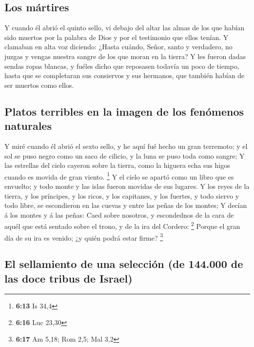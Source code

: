 \hypertarget{los-muxe1rtires}{%
\subsection{Los mártires}\label{los-muxe1rtires}}

 Y cuando él abrió el quinto sello, vi debajo del altar
las almas de los que habían sido muertos por la palabra de Dios y por el
testimonio que ellos tenían.  Y clamaban en alta voz
diciendo: ¿Hasta cuándo, Señor, santo y verdadero, no juzgas y vengas
nuestra sangre de los que moran en la tierra?  Y les
fueron dadas sendas ropas blancas, y fuéles dicho que reposasen todavía
un poco de tiempo, hasta que se completaran sus consiervos y sus
hermanos, que también habían de ser muertos como ellos.

\hypertarget{platos-terribles-en-la-imagen-de-los-fenuxf3menos-naturales}{%
\subsection{Platos terribles en la imagen de los fenómenos
naturales}\label{platos-terribles-en-la-imagen-de-los-fenuxf3menos-naturales}}

 Y miré cuando él abrió el sexto sello, y he aquí fué
hecho un gran terremoto; y el sol se puso negro como un saco de cilicio,
y la luna se puso toda como sangre;  Y las estrellas del
cielo cayeron sobre la tierra, como la higuera echa sus higos cuando es
movida de gran viento. \footnote{\textbf{6:13} Is 34,4} 
Y el cielo se apartó como un libro que es envuelto; y todo monte y las
islas fueron movidas de sus lugares.  Y los reyes de la
tierra, y los príncipes, y los ricos, y los capitanes, y los fuertes, y
todo siervo y todo libre, se escondieron en las cuevas y entre las peñas
de los montes;  Y decían á los montes y á las peñas: Caed
sobre nosotros, y escondednos de la cara de aquél que está sentado sobre
el trono, y de la ira del Cordero: \footnote{\textbf{6:16} Luc 23,30}
 Porque el gran día de su ira es venido; ¿y quién podrá
estar firme? \footnote{\textbf{6:17} Am 5,18; Rom 2,5; Mal 3,2}

\hypertarget{el-sellamiento-de-una-selecciuxf3n-de-144.000-de-las-doce-tribus-de-israel}{%
\subsection{El sellamiento de una selección (de 144.000 de las doce
tribus de
Israel)}\label{el-sellamiento-de-una-selecciuxf3n-de-144.000-de-las-doce-tribus-de-israel}}

